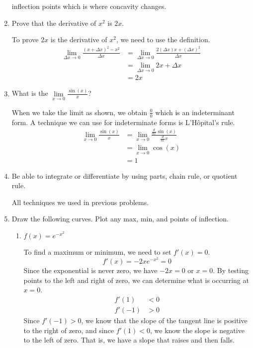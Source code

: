 \begin{enumerate}
  inflection points which is where concavity changes.
\item
  Prove that the derivative of \(x^2\) is \(2x\).
  \par\smallskip
  To prove \(2x\) is the derivative of \(x^2\), we need to use the definition.
  \begin{align*}
    \lim_{\Delta x\to 0}\frac{(x + \Delta x)^2 - x^2}{\Delta x}
    &= \lim_{\Delta x\to 0}\frac{2(\Delta x)x + (\Delta x)^2}{\Delta x}\\
    &= \lim_{\Delta x\to 0}2x + \Delta x\\
    & = 2x
  \end{align*}
\item
  What is the \(\lim\limits_{x\to 0}\frac{\sin(x)}{x}\)?
  \par\smallskip
  When we take the limit as shown, we obtain \(\frac{0}{0}\) which is an
  indeterminant form.
  A technique we can use for indeterminate forms is L'H{\^o}pital's rule.
  \begin{align*}
    \lim_{x\to 0}\frac{\sin(x)}{x}
    &= \lim_{x\to 0}\frac{\frac{d}{dx}\sin(x)}{\frac{d}{dx}x}\\
    &= \lim_{x\to 0}\cos(x)\\
    &= 1
  \end{align*}
\item
  Be able to integrate or differentiate by using parts, chain rule, or quotient
  rule.
  \par\smallskip
  All techniques we used in previous problems.
\item
  Draw the following curves.
  Plot any max, min, and points of inflection.
  \begin{enumerate}[label = (\alph*)]
  \item
    \(f(x) = e^{-x^2}\)
    \par\smallskip
    To find a maximum or minimum, we need to set \(f'(x) = 0\).
    \[
    f'(x) = -2xe^{-x^2} = 0
    \]
    Since the exponential is never zero, we have \(-2x = 0\) or \(x = 0\).
    By testing points to the left and right of zero, we can determine what is
    occurring at \(x = 0\).
    \begin{align*}
      f'(1) &< 0\\
      f'(-1) &> 0
    \end{align*}
    Since \(f'(-1) > 0\), we know that the slope of the tangent line is positive
    to the right of zero, and since \(f'(1) < 0\), we know the slope is negative
    to the left of zero.
    That is, we have a slope that raises and then falls.

\end{enumerate}
\end{enumerate}
